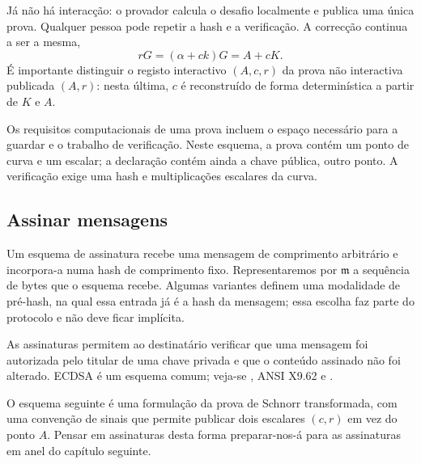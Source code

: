 Já não há interacção: o provador calcula o desafio localmente e publica uma
única prova. Qualquer pessoa pode repetir a hash e a verificação. A correcção
continua a ser a mesma,
\[
rG=(\alpha+ck)G=A+cK.
\]
É importante distinguir o registo interactivo \((A,c,r)\) da prova
não interactiva publicada \((A,r)\): nesta última, \(c\) é reconstruído de
forma determinística a partir de \(K\) e \(A\).

%
Os requisitos computacionais de uma prova incluem o espaço necessário para a
guardar e o trabalho de verificação. Neste esquema, a prova contém um ponto de
curva e um escalar; a declaração contém ainda a chave pública, outro ponto. A
verificação exige uma hash e multiplicações escalares da curva.



\subsection{Assinar mensagens}
\label{sec:signing-messages}

Um esquema de assinatura recebe uma mensagem de comprimento arbitrário e
incorpora-a numa hash de comprimento fixo. Representaremos por
\(\mathfrak{m}\) a sequência de bytes que o esquema recebe. Algumas variantes
definem uma modalidade de pré-hash, na qual essa entrada já é a hash da mensagem;
essa escolha faz parte do protocolo e não deve ficar implícita.

As assinaturas permitem ao destinatário verificar que uma mensagem foi
autorizada pelo titular de uma chave privada e que o conteúdo assinado não foi
alterado. ECDSA é um esquema comum; veja-se \cite{ecdsa}, ANSI X9.62 e
\cite{Hankerson:2003:GEC:940321}.


O esquema seguinte é uma formulação da prova de Schnorr transformada, com uma
convenção de sinais que permite publicar dois escalares \((c,r)\) em vez do
ponto \(A\). Pensar em assinaturas desta forma preparar-nos-á para as
assinaturas em anel do capítulo seguinte.

